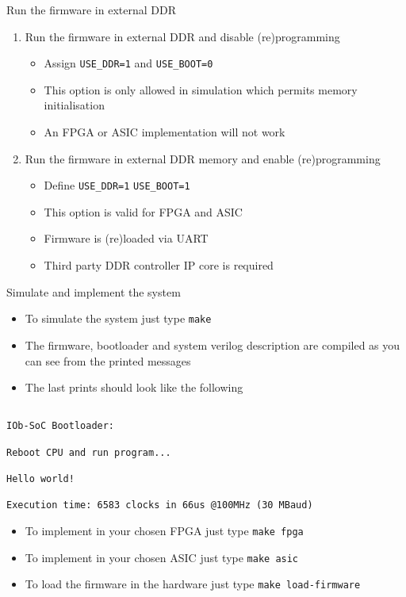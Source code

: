 \documentclass [xcolor=svgnames, t] {beamer}
\begin{document}
\begin{frame}{Run the firmware in external DDR}
\begin{enumerate}
\item Run the firmware in external DDR and disable (re)programming
  \begin{itemize}
  \item Assign {\tt USE\_DDR=1} and {\tt USE\_BOOT=0}
  \item This option is only allowed in simulation which permits memory initialisation
  \item An FPGA or ASIC implementation will not work
  \end{itemize}
\item Run the firmware in external DDR memory and enable (re)programming
  \begin{itemize}
  \item Define {\tt USE\_DDR=1} {\tt USE\_BOOT=1}
  \item This option is valid for FPGA and ASIC
  \item Firmware is (re)loaded via UART
  \item Third party DDR controller IP core is required
  \end{itemize}
\end{enumerate}
\end{frame}

\begin{frame}[fragile]{Simulate and implement the system}

\begin{itemize}
\item To simulate the system just type {\tt make} 
\item The firmware, bootloader and system verilog description are compiled as you can see from the printed messages
\item The last prints should look like the following
\end{itemize}

\begin{tiny}
\begin{lstlisting}

IOb-SoC Bootloader:

Reboot CPU and run program...

Hello world!

Execution time: 6583 clocks in 66us @100MHz (30 MBaud)

\end{lstlisting}
\end{tiny}

\begin{itemize}
\item To implement in your chosen FPGA just type {\tt make fpga}
\item To implement in your chosen ASIC just type {\tt make asic}
\item To load the firmware in the hardware just type {\tt make load-firmware}
\end{itemize}

\end{frame}
\end{document}
